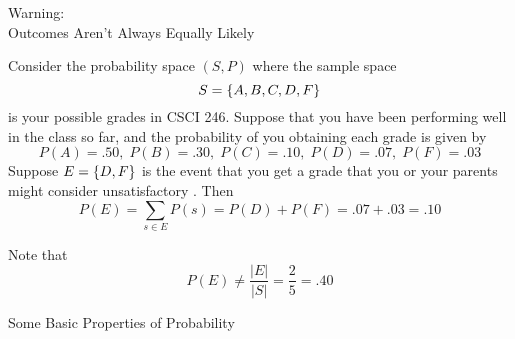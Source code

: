 \documentclass[10pt]{beamer}
\begin{document}
\begin{frame}[standout]
Warning: \\
Outcomes Aren't Always Equally Likely
\end{frame}

\begin{frame}

\begin{myredbox}[title=\text{Warning: Outcomes Aren't Always Equally Likely}]
Consider the probability space $(S,P)$ where the sample space
\[ S=\{ {A,B,C,D,F} \}\]
is your possible grades in CSCI 246. Suppose that you have been performing well in the class so far, and the probability of you obtaining each grade is given by
\[ P(A)= .50, \; P(B)= .30, \;  P(C)= .10, \;  P(D)= .07, \;  P(F)= .03 \]
Suppose $E=\{ {D,F} \}$ is the event that you get a grade that you or your parents might consider unsatisfactory .
Then
\[ P(E) = \sum_{s \in E} P(s) = P(D) + P(F) = .07 + .03 = .10\]

Note that 
\[ P(E) \neq \frac{|E|}{|S|} = \frac{2}{5} = .40\]
\end{myredbox}

\end{frame}




\begin{frame}[standout]
Some Basic Properties of Probability	
\end{frame}
\end{document}
